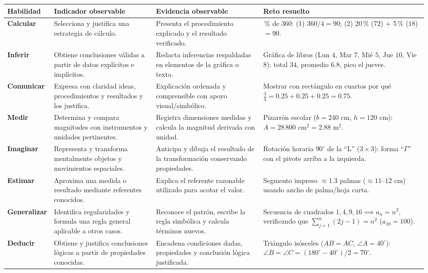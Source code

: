 \documentclass[spanish,letterpaper,oneside]{article}
\begin{document}
{\scriptsize{}\renewcommand{\arraystretch}{1.12}
\noindent\begin{tabularx}{\textwidth}{|>{\raggedright\arraybackslash}p{}|>{\raggedright\arraybackslash}p{}|>{\raggedright\arraybackslash}p{}|>{\raggedright\arraybackslash}X|}\hline
\rowcolor{iiiepePale} \textbf{Habilidad} & \textbf{Indicador observable} & \textbf{Evidencia observable} & \textbf{Reto resuelto} \\\hline
\textbf{Calcular} & Selecciona y justifica una estrategia de cálculo. & Presenta el procedimiento explicado y el resultado verificado. & 25\,\% de $360$: (1) $360/4 = 90$; (2) 20\,\% ($72$) $+$ 5\,\% ($18$) $= 90$. \\\hline
\textbf{Inferir} & Obtiene conclusiones válidas a partir de datos explícitos e implícitos. & Redacta inferencias respaldadas en elementos de la gráfica o texto. & Gráfica de libros (Lun $4$, Mar $7$, Mié $5$, Jue $10$, Vie $8$): total $34$, promedio $6.8$, pico el jueves. \\\hline
\textbf{Comunicar} & Expresa con claridad ideas, procedimientos y resultados y los justifica. & Explicación ordenada y comprensible con apoyo visual/simbólico. & Mostrar con rectángulo en cuartos por qué $\frac{3}{4} = 0.25+0.25+0.25 = 0.75$. \\\hline
\textbf{Medir} & Determina y compara magnitudes con instrumentos y unidades pertinentes. & Registra dimensiones medidas y calcula la magnitud derivada con unidad. & Pizarrón escolar ($b=240\text{ cm}$, $h=120\text{ cm}$): $A = 28\,800\text{ cm}^2 = 2.88\text{ m}^2$. \\\hline
\textbf{Imaginar} & Representa y transforma mentalmente objetos y movimientos espaciales. & Anticipa y dibuja el resultado de la transformación conservando propiedades. & Rotación horaria $90^\circ$ de la ``L'' ($3\times 3$): forma ``$\Gamma$'' con el pivote arriba a la izquierda. \\\hline
\textbf{Estimar} & Aproxima una medida o resultado mediante referentes conocidos. & Explica el referente razonable utilizado para acotar el valor. & Segmento impreso $\approx 1.3$ palmas ($\approx 11\text{--}12\text{ cm}$) usando ancho de palma/hoja carta. \\\hline
\textbf{Generalizar} & Identifica regularidades y formula una regla general aplicable a otros casos. & Reconoce el patrón, escribe la regla simbólica y calcula términos nuevos. & Secuencia de cuadrados $1, 4, 9, 16 \implies a_n = n^2$, verificando que $\sum_{j=1}^n (2j-1)=n^2$ ($a_{10} = 100$). \\\hline
\textbf{Deducir} & Obtiene y justifica conclusiones lógicas a partir de propiedades conocidas. & Encadena condiciones dadas, propiedades y conclusión lógica justificada. & Triángulo isósceles ($AB=AC$, $\angle A=40^\circ$): $\angle B=\angle C=(180^\circ-40^\circ)/2=70^\circ$. \\\hline
\end{tabularx}}
\vspace{4pt}
\end{document}
